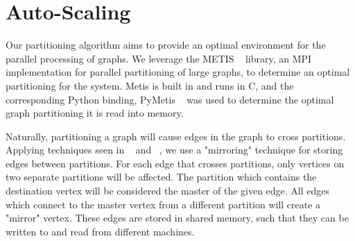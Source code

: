 \section{Auto-Scaling}
\label{sec:autoscaling}

Our partitioning algorithm aims to provide an optimal environment
for the parallel processing of graphs. We leverage the METIS
~\cite{Lasalle:2013:metis} library, an MPI implementation for parallel
partitioning of large graphs, to determine an optimal partitioning for the system.
Metis is built in and runs in C, and the corresponding Python binding, PyMetis ~\cite{pymetis}
was used to determine the optimal graph partitioning it is read into memory.


Naturally, partitioning a graph will cause edges in the graph to cross 
partitions. Applying techniques seen in ~\cite{Tian:2013:thinklikeagraph} and 
~\cite{Chen:2015:powerlyra}, we use a "mirroring" technique for storing edges
between partitions. For each edge that crosses partitions, only vertices on 
two separate partitions will be affected. The partition which contains the 
destination vertex will be considered the master of the given edge. All edges 
which connect to the master vertex from a different partition will create a
"mirror" vertex. These edges are stored in shared memory, such that they can
be written to and read from different machines.


